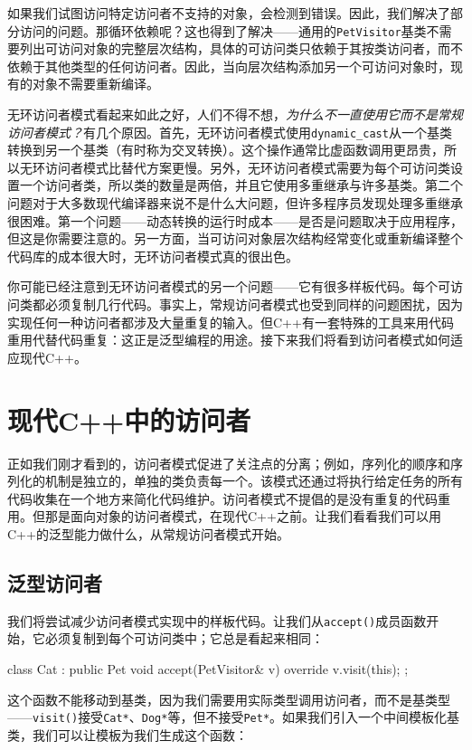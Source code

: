 \begin{code}
{如果我们试图访问特定访问者不支持的对象，会检测到错误。因此，我们解决了部分访问的问题。那循环依赖呢？这也得到了解决——通用的\texttt{PetVisitor}基类不需要列出可访问对象的完整层次结构，具体的可访问类只依赖于其按类访问者，而不依赖于其他类型的任何访问者。因此，当向层次结构添加另一个可访问对象时，现有的对象不需要重新编译。

无环访问者模式看起来如此之好，人们不得不想，\emph{为什么不一直使用它而不是常规访问者模式？}有几个原因。首先，无环访问者模式使用\texttt{dynamic\_cast}从一个基类转换到另一个基类（有时称为交叉转换）。这个操作通常比虚函数调用更昂贵，所以无环访问者模式比替代方案更慢。另外，无环访问者模式需要为每个可访问类设置一个访问者类，所以类的数量是两倍，并且它使用多重继承与许多基类。第二个问题对于大多数现代编译器来说不是什么大问题，但许多程序员发现处理多重继承很困难。第一个问题——动态转换的运行时成本——是否是问题取决于应用程序，但这是你需要注意的。另一方面，当可访问对象层次结构经常变化或重新编译整个代码库的成本很大时，无环访问者模式真的很出色。

你可能已经注意到无环访问者模式的另一个问题——它有很多样板代码。每个可访问类都必须复制几行代码。事实上，常规访问者模式也受到同样的问题困扰，因为实现任何一种访问者都涉及大量重复的输入。但C++有一套特殊的工具来用代码重用代替代码重复：这正是泛型编程的用途。接下来我们将看到访问者模式如何适应现代C++。

\section{现代C++中的访问者}

正如我们刚才看到的，访问者模式促进了关注点的分离；例如，序列化的顺序和序列化的机制是独立的，单独的类负责每一个。该模式还通过将执行给定任务的所有代码收集在一个地方来简化代码维护。访问者模式不提倡的是没有重复的代码重用。但那是面向对象的访问者模式，在现代C++之前。让我们看看我们可以用C++的泛型能力做什么，从常规访问者模式开始。

\subsection{泛型访问者}

我们将尝试减少访问者模式实现中的样板代码。让我们从\texttt{accept()}成员函数开始，它必须复制到每个可访问类中；它总是看起来相同：

\begin{code}
class Cat : public Pet {
  void accept(PetVisitor& v) override { v.visit(this); }
};
\end{code}

这个函数不能移动到基类，因为我们需要用实际类型调用访问者，而不是基类型——\texttt{visit()}接受\texttt{Cat*}、\texttt{Dog*}等，但不接受\texttt{Pet*}。如果我们引入一个中间模板化基类，我们可以让模板为我们生成这个函数：

}
\end{code}
